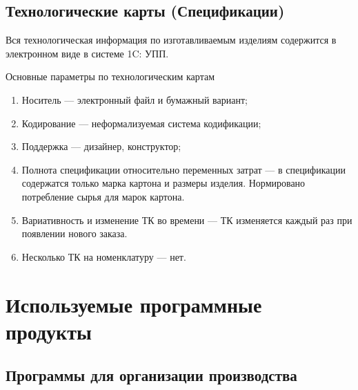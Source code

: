 \subsection{Технологические карты (Спецификации)}


Вся технологическая информация по изготавливаемым изделиям содержится в электронном виде в системе 1C: УПП. 


Основные параметры по технологическим картам
\begin{enumerate}
\item Носитель --- электронный файл и бумажный вариант;
\item Кодирование ---  неформализуемая система кодификации;
\item Поддержка --- дизайнер, конструктор;
\item Полнота спецификации относительно переменных затрат --- в спецификации содержатся только марка картона и размеры изделия. Нормировано потребление сырья для марок картона.
\item Вариативность и изменение ТК во времени --- ТК изменяется каждый раз при появлении нового заказа.
\item Несколько ТК на номенклатуру --- нет.
\end{enumerate}



\section{Используемые программные продукты}

\subsection{Программы для организации производства}


